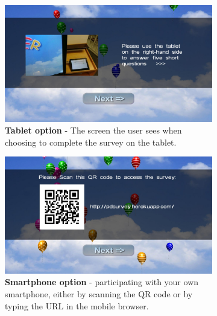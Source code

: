     \begin{figure}
        \centering
        \begin{subfigure}[b]{0.7\textwidth}
            \centering
            \includegraphics[width=\columnwidth]{img/screenshots/balloon-game/option-tablet.jpg}
            \caption{\textbf{Tablet option} - The screen the user sees when choosing to complete the survey on the tablet. \\}
            \label{screenshot:tablet-option}
        \end{subfigure}
        \hfill
        \begin{subfigure}[b]{0.7\textwidth}
            \centering
            \includegraphics[width=\columnwidth]{img/screenshots/balloon-game/option-smartphone.jpg}
            \caption{\textbf{Smartphone option} - participating with your own smartphone, either by scanning the QR code or by typing the URL in the mobile browser. \\}
            \label{screenshot:smartphone-option}
        \end{subfigure}
        \hfill
        \begin{subfigure}[b]{0.7\textwidth}

\end{subfigure}
\end{figure}
